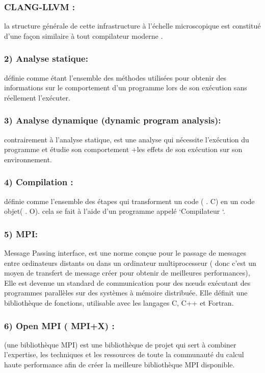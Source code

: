 \documentclass[12pt,titlepage]{report}
\begin{document}
\subsubsection{CLANG-LLVM :} la structure générale de cette infrastructure à l’échelle microscopique est constitué d’une façon similaire à tout compilateur moderne .\\

\subsubsection{2) Analyse statique:} définie comme étant l'ensemble des méthodes utilisées pour obtenir des informations sur le comportement d’un programme lors de son exécution sans réellement l’exécuter.\\

\subsubsection{3) Analyse dynamique (dynamic program analysis): }contrairement à l’analyse statique, est une analyse qui nécessite l’exécution du programme et étudie son comportement +les effets de son exécution sur son environnement.\\

\subsubsection{4) Compilation : }définie comme l’ensemble des étapes qui transforment un code ( . C) en un code objet( . O). cela se fait à l’aide d’un programme appelé ‘Compilateur ‘.\\

\subsubsection{5) MPI:} Message Passing interface, est une norme conçue pour le passage de messages entre ordinateurs distants ou dans un ordinateur multiprocesseur ( donc c’est un moyen de transfert de message créer pour obtenir de meilleures performances), Elle est devenue un standard de communication pour des nœuds exécutant des programmes parallèles sur des systèmes à mémoire distribuée. Elle définit une bibliothèque de fonctions, utilisable avec les langages C, C++ et Fortran.\\ 

\subsubsection{6) Open MPI ( MPI+X) :}(une bibliothèque MPI) est une bibliothèque de projet qui sert à combiner l'expertise, les techniques et les ressources de toute la communauté du calcul haute performance afin de créer la meilleure bibliothèque MPI disponible.\\
\end{document}
